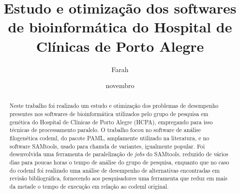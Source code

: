 \documentclass[cic,tc]{iiufrgs}
\title{Estudo e otimização dos softwares de bioinformática do Hospital de
Clínicas de Porto Alegre}
\author{Farah}{Alef}
\date{novembro}{2021}
\begin{document}
\maketitle



\begin{abstract}
  Neste trabalho foi realizado um estudo e otimização dos problemas de
  desempenho presentes nos softwares de bioinformática utilizados pelo grupo de
  pesquisa em genética do Hospital de Clínicas de Porto Alegre (HCPA),
  empregando para isso técnicas de processamento paralelo. O trabalho focou
  no software de análise filogenética codeml, do pacote PAML, amplamente
  utilizado na literatura, e no software SAMtools, usado para chamda de
  variantes, igualmente popular. Foi desenvolvida uma ferramenta de
  paralelização de \textit{jobs} do SAMtools, reduzido de vários dias para
  poucas horas o tempo de análise do grupo de pesquisa, enquanto que no caso do
  codeml foi realizado uma análise de desempenho de alternativas encontradas em
  revisão bibliográfica, fornecendo aos pesquisadores uma ferramenta que reduz
  em mais da metade o tempo de execução em relação ao codeml original.
\end{abstract}
\end{document}
